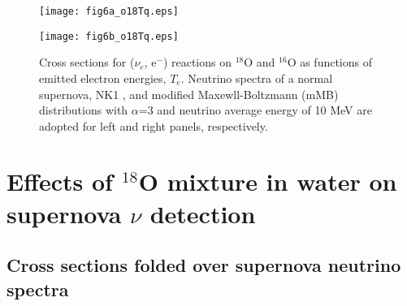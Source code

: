 \documentclass[preprint,12pt]{elsarticle}
\begin{document}
\begin{figure}[htbp]
\vspace*{-0.5cm}
\hspace{-7mm}
\begin{minipage}{0.45\hsize}
\begin{center}
\texttt{[image: fig6a\_o18Tq.eps]}
\end{center}
\end{minipage}
\hspace*{10mm}
\begin{minipage}{0.45\hsize}
\begin{center}
\texttt{[image: fig6b\_o18Tq.eps]}
\end{center}
\end{minipage}
\vspace{-2cm}
\caption{\small 
Cross sections for ($\nu_e$, e$^{-}$) reactions on $^{18}$O and $^{16}$O as functions of emitted electron energies, $T_e$. 
Neutrino spectra of a normal supernova, NK1 \cite{Nakazato2018,Naka2013}, and modified Maxewll-Boltzmann (mMB) distributions with $\alpha$=3 and neutrino average energy of 10 MeV are adopted for left and right panels, respectively.
} 
\label{ratio}
\end{figure}

\section{Effects of $^{18}$O mixture in water on supernova $\nu$ detection}
\subsection{Cross sections folded over supernova neutrino spectra}
\end{document}
